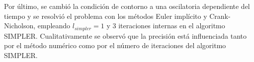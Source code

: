 \documentclass[aps,prb,twocolumn,superscriptaddress,floatfix,longbibliography,10pt]{revtex4-2}
\begin{document}
Por último, se cambió la condición de contorno a una oscilatoria dependiente del tiempo y se resolvió el problema con los métodos Euler implícito y Crank-Nicholson, empleando $l_{simpler} = 1$ y $3$ iteraciones internas en el algoritmo SIMPLER. Cualitativamente se observó que la precisión está influenciada tanto por el método numérico como por el número de iteraciones del algoritmo SIMPLER.






\end{document}
